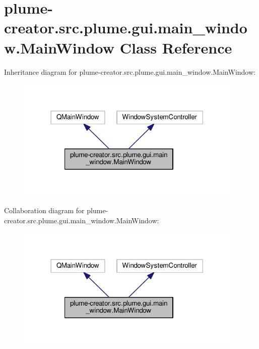 \hypertarget{classplume-creator_1_1src_1_1plume_1_1gui_1_1main__window_1_1_main_window}{}\section{plume-\/creator.src.\+plume.\+gui.\+main\+\_\+window.\+Main\+Window Class Reference}
\label{classplume-creator_1_1src_1_1plume_1_1gui_1_1main__window_1_1_main_window}


Inheritance diagram for plume-\/creator.src.\+plume.\+gui.\+main\+\_\+window.\+Main\+Window\+:\nopagebreak
\begin{figure}[H]
\begin{center}
\leavevmode
\includegraphics[width=306pt]{classplume-creator_1_1src_1_1plume_1_1gui_1_1main__window_1_1_main_window__inherit__graph}
\end{center}
\end{figure}


Collaboration diagram for plume-\/creator.src.\+plume.\+gui.\+main\+\_\+window.\+Main\+Window\+:\nopagebreak
\begin{figure}[H]
\begin{center}
\leavevmode
\includegraphics[width=306pt]{classplume-creator_1_1src_1_1plume_1_1gui_1_1main__window_1_1_main_window__coll__graph}
\end{center}
\end{figure}
